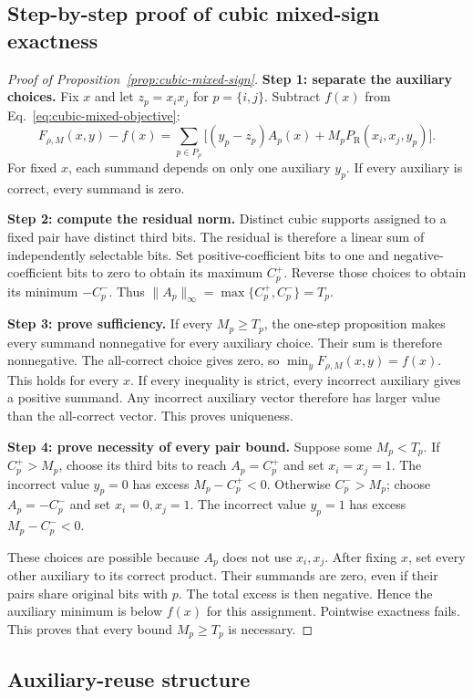 \documentclass[a4paper,onecolumn,11pt,unpublished]{quantumarticle}
\theoremstyle{remark}
\begin{document}
\subsection{Step-by-step proof of cubic mixed-sign exactness}
\label{app:cubic-exactness-steps}
\begin{proof}[Proof of Proposition~\ref{prop:cubic-mixed-sign}]
\textbf{Step 1: separate the auxiliary choices.}
Fix $x$ and let $z_p=x_ix_j$ for $p=\{i,j\}$.
Subtract $f(x)$ from Eq.~\eqref{eq:cubic-mixed-objective}:
\[
F_{\rho,M}(x,y)-f(x)
=\sum_{p\in P_\rho}
\bigl[(y_p-z_p)A_p(x)+M_pP_{\mathrm R}(x_i,x_j,y_p)\bigr].
\]
For fixed $x$, each summand depends on only one auxiliary $y_p$.
If every auxiliary is correct, every summand is zero.

\textbf{Step 2: compute the residual norm.}
Distinct cubic supports assigned to a fixed pair have distinct third bits.
The residual is therefore a linear sum of independently selectable bits.
Set positive-coefficient bits to one and negative-coefficient bits to zero
to obtain its maximum $C_p^+$.
Reverse those choices to obtain its minimum $-C_p^-$.
Thus $\|A_p\|_\infty=\max\{C_p^+,C_p^-\}=T_p$.

\textbf{Step 3: prove sufficiency.}
If every $M_p\geq T_p$, the one-step proposition makes every summand
nonnegative for every auxiliary choice.
Their sum is therefore nonnegative.
The all-correct choice gives zero, so $\min_yF_{\rho,M}(x,y)=f(x)$.
This holds for every $x$.
If every inequality is strict, every incorrect auxiliary gives a positive
summand. Any incorrect auxiliary vector therefore has larger value than
the all-correct vector. This proves uniqueness.

\textbf{Step 4: prove necessity of every pair bound.}
Suppose some $M_p<T_p$.
If $C_p^+>M_p$, choose its third bits to reach $A_p=C_p^+$ and set
$x_i=x_j=1$. The incorrect value $y_p=0$ has excess
$M_p-C_p^+<0$.
Otherwise $C_p^->M_p$; choose $A_p=-C_p^-$ and set $x_i=0,x_j=1$.
The incorrect value $y_p=1$ has excess $M_p-C_p^-<0$.

These choices are possible because $A_p$ does not use $x_i,x_j$.
After fixing $x$, set every other auxiliary to its correct product.
Their summands are zero, even if their pairs share original bits with $p$.
The total excess is then negative. Hence the auxiliary minimum is below
$f(x)$ for this assignment. Pointwise exactness fails.
This proves that every bound $M_p\geq T_p$ is necessary.
\end{proof}

\subsection{Auxiliary-reuse structure}
\label{app:cubic-structure}
\end{document}

